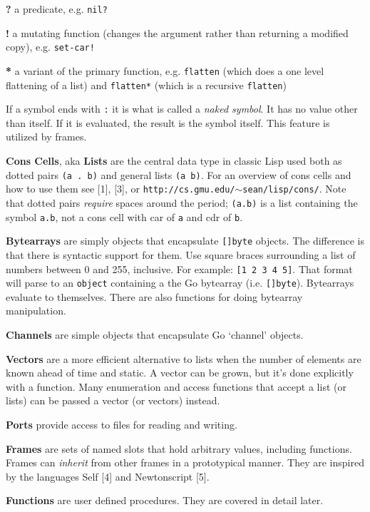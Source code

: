 \documentclass{article}
\begin{document}
\textbf{?} a predicate, e.g. \verb|nil?|

\textbf{!} a mutating function (changes the argument rather than returning a modified copy),
e.g. \verb|set-car!|

\textbf{*} a variant of the primary function, e.g. \verb|flatten| (which does a one level
flattening of a list) and \verb|flatten*| (which is a recursive \verb|flatten|)

If a symbol ends with \verb|:| it is what is called a \emph{naked symbol}. It has no value
other than itself. If it is evaluated, the result is the symbol itself. This feature is
utilized by frames.

\textbf{Cons Cells}, aka \textbf{Lists} are the central data type in classic Lisp used both as
dotted pairs \verb|(a . b)| and general lists \verb|(a b)|. For an overview of cons cells
and how to use them see [1], [3], or
\texttt{http://cs.gmu.edu/\ensuremath{\sim}sean/lisp/cons/}. Note that dotted pairs
\emph{require} spaces around the period; \verb|(a.b)| is a list containing the symbol
\verb|a.b|, not a cons cell with car of \verb|a| and cdr of \verb|b|.

\textbf{Bytearrays} are simply objects that encapsulate \verb|[]byte| objects. The
difference is that there is syntactic support for them. Use square braces surrounding a list
of numbers between 0 and 255, inclusive. For example: \verb|[1 2 3 4 5]|. That format will
parse to an \verb|object| containing a the Go bytearray (i.e. \verb|[]byte|). Bytearrays
evaluate to themselves. There are also functions for doing bytearray manipulation.

\textbf{Channels} are simple objects that encapsulate Go `channel' objects.

\textbf{Vectors} are a more efficient alternative to lists when the number of elements are
known ahead of time and static. A vector can be grown, but it's done explicitly with a
function. Many enumeration and access functions that accept a list (or lists) can be passed a
vector (or vectors) instead.

\textbf{Ports} provide access to files for reading and writing.

\textbf{Frames} are sets of named slots that hold arbitrary values, including functions.
Frames can \emph{inherit} from other frames in a prototypical manner. They are inspired by the
languages Self [4] and Newtonscript [5].

\textbf{Functions} are user defined procedures. They are covered in detail later.
\end{document}
